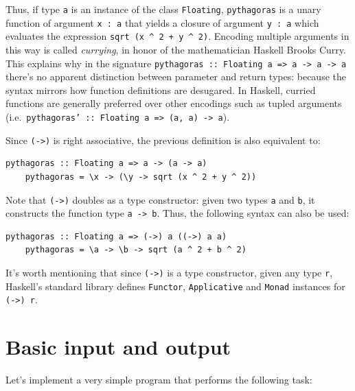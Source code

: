 \documentclass[UdineBachThesis,american,11pt]{PhdThesis}
\begin{document}
  Thus, if type \texttt{a} is an instance of the class \mbox{\texttt{Floating}},
  \mbox{\texttt{pythagoras}} is a unary function of argument
  \mbox{\texttt{x : a}} that yields a closure of argument \mbox{\texttt{y : a}}
  which evaluates the expression
  \mbox{\texttt{sqrt (x {\textasciicircum} 2 + y {\textasciicircum} 2)}}.
  Encoding multiple arguments in this way is called \emph{currying}, in honor of
  the mathematician Haskell Brooks Curry. This explains why in the signature
  \mbox{\texttt{pythagoras :: Floating a => a -> a -> a}} there's no apparent
  distinction between parameter and return types: because the syntax mirrors how
  function definitions are desugared. In Haskell, curried functions are
  generally preferred over other encodings such as tupled arguments (i.e.\
  \mbox{\texttt{pythagoras' :: Floating a => (a, a) -> a}}).

  Since \mbox{\texttt{(->)}} is right associative, the previous definition is
  also equivalent to:

  \begin{Verbatim}[gobble=4,fontsize=\small]
    pythagoras :: Floating a => a -> (a -> a)
    pythagoras = \x -> (\y -> sqrt (x ^ 2 + y ^ 2))
  \end{Verbatim}

  Note that \mbox{\texttt{(->)}} doubles as a type constructor: given two types
  \texttt{a} and \texttt{b}, it constructs the function type
  \mbox{\texttt{a -> b}}. Thus, the following syntax can also be used:

  \begin{Verbatim}[gobble=4,fontsize=\small]
    pythagoras :: Floating a => (->) a ((->) a a)
    pythagoras = \a -> \b -> sqrt (a ^ 2 + b ^ 2)
  \end{Verbatim}

  It's worth mentioning that since \mbox{\texttt{(->)}} is a type constructor,
  given any type \texttt{r}, Haskell's standard library defines
  \mbox{\texttt{Functor}}, \mbox{\texttt{Applicative}} and \mbox{\texttt{Monad}}
  instances for \mbox{\texttt{(->) r}}.

  \section{Basic input and output}

  Let's implement a very simple program that performs the following task:
\end{document}
